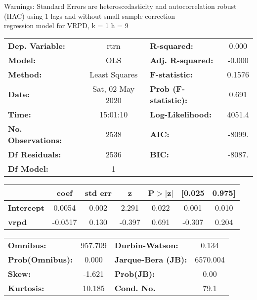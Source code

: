 Warnings: \newline
 [1] Standard Errors are heteroscedasticity and autocorrelation robust (HAC) using 1 lags and without small sample correction\\ 

regression model for VRPD, k = 1 h = 9\begin{center}
\begin{tabular}{lclc}
\toprule
\textbf{Dep. Variable:}    &       rtrn       & \textbf{  R-squared:         } &     0.000   \\
\textbf{Model:}            &       OLS        & \textbf{  Adj. R-squared:    } &    -0.000   \\
\textbf{Method:}           &  Least Squares   & \textbf{  F-statistic:       } &    0.1576   \\
\textbf{Date:}             & Sat, 02 May 2020 & \textbf{  Prob (F-statistic):} &    0.691    \\
\textbf{Time:}             &     15:01:10     & \textbf{  Log-Likelihood:    } &    4051.4   \\
\textbf{No. Observations:} &        2538      & \textbf{  AIC:               } &    -8099.   \\
\textbf{Df Residuals:}     &        2536      & \textbf{  BIC:               } &    -8087.   \\
\textbf{Df Model:}         &           1      & \textbf{                     } &             \\
\bottomrule
\end{tabular}
\begin{tabular}{lcccccc}
                   & \textbf{coef} & \textbf{std err} & \textbf{z} & \textbf{P$> |$z$|$} & \textbf{[0.025} & \textbf{0.975]}  \\
\midrule
\textbf{Intercept} &       0.0054  &        0.002     &     2.291  &         0.022        &        0.001    &        0.010     \\
\textbf{vrpd}      &      -0.0517  &        0.130     &    -0.397  &         0.691        &       -0.307    &        0.204     \\
\bottomrule
\end{tabular}
\begin{tabular}{lclc}
\textbf{Omnibus:}       & 957.709 & \textbf{  Durbin-Watson:     } &    0.134  \\
\textbf{Prob(Omnibus):} &   0.000 & \textbf{  Jarque-Bera (JB):  } & 6570.004  \\
\textbf{Skew:}          &  -1.621 & \textbf{  Prob(JB):          } &     0.00  \\
\textbf{Kurtosis:}      &  10.185 & \textbf{  Cond. No.          } &     79.1  \\
\bottomrule
\end{tabular}
\end{center}

